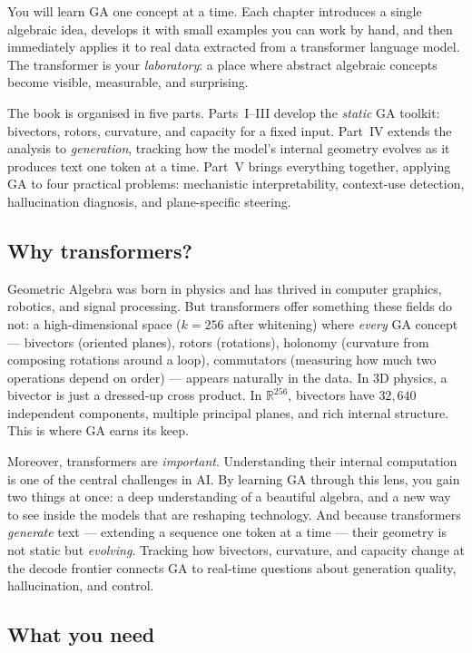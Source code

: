 \documentclass[11pt, twoside, openright]{memoir}
\numberwithin{equation}{chapter}
\begin{document}
You will learn GA one concept at a time.  Each chapter introduces a single
algebraic idea, develops it with small examples you can work by hand, and
then immediately applies it to real data extracted from a transformer
language model.  The transformer is your \emph{laboratory}: a place where
abstract algebraic concepts become visible, measurable, and surprising.

The book is organised in five parts.  Parts~I--III develop the
\emph{static} GA toolkit: bivectors, rotors, curvature, and capacity
for a fixed input.  Part~IV extends the analysis to \emph{generation},
tracking how the model's internal geometry evolves as it produces text
one token at a time.  Part~V brings everything together, applying GA to
four practical problems: mechanistic interpretability, context-use
detection, hallucination diagnosis, and plane-specific steering.

\subsection*{Why transformers?}

Geometric Algebra was born in physics and has thrived in computer graphics,
robotics, and signal processing.  But transformers offer something these
fields do not: a high-dimensional space ($k = 256$ after whitening) where
\emph{every} GA concept --- bivectors (oriented planes), rotors (rotations), holonomy (curvature from composing rotations around a loop), commutators (measuring how much two operations depend on order) ---
appears naturally in the data.  In 3D physics, a bivector is just a
dressed-up cross product.  In $\mathbb{R}^{256}$, bivectors have
$32{,}640$ independent components, multiple principal planes, and rich
internal structure.  This is where GA earns its keep.

Moreover, transformers are \emph{important}.  Understanding their internal
computation is one of the central challenges in AI.  By learning GA
through this lens, you gain two things at once: a deep understanding of
a beautiful algebra, and a new way to see inside the models that are
reshaping technology.  And because transformers \emph{generate} text ---
extending a sequence one token at a time --- their geometry is not
static but \emph{evolving}.  Tracking how bivectors, curvature, and
capacity change at the decode frontier connects GA to real-time
questions about generation quality, hallucination, and control.

\subsection*{What you need}
\end{document}
